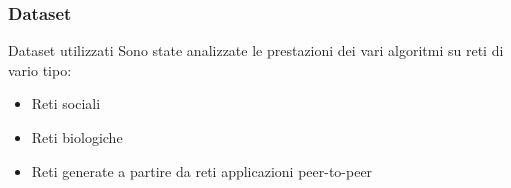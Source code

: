 \begin{frame}
    \frametitle{Dataset}

    \begin{block}{Dataset utilizzati}
        Sono state analizzate le prestazioni dei vari algoritmi su reti di vario tipo:
        \begin{itemize}
            \item Reti sociali
            \item Reti biologiche
            \item Reti generate a partire da reti applicazioni peer-to-peer
        \end{itemize}
    \end{block}
    
         

\end{frame}